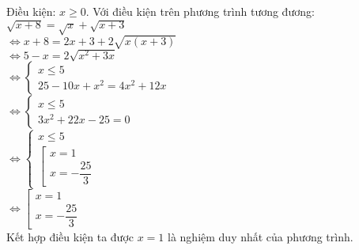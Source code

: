 \begin{Answer}{5}
Điều kiện: $ x \geq 0 $.
Với điều kiện trên phương trình tương đương: $ \sqrt{x+8 } = \sqrt{x } + \sqrt{x + 3}  $ \\
$ \Leftrightarrow x+8 = 2x +3 + 2 \sqrt{x(x+3 ) } $ \\
$ \Leftrightarrow 5-x = 2 \sqrt{x^2 + 3x } $ \\
$ \Leftrightarrow \begin{cases}
    x \leq 5 \\
    25 -10x + x^2 = 4x^2 + 12x
\end{cases} $ \\
$ \Leftrightarrow \begin{cases}
    x \leq 5 \\
    3x^2 +22x -25 =0
\end{cases} $ \\
$ \Leftrightarrow \begin{cases}
    x \leq 5 \\
    \left[
        \begin{array}{l}
            x =1 \\
            x= -\dfrac{25 }{3 }
        \end{array}
    \right.
\end{cases} $ \\
$ \Leftrightarrow \left[
    \begin{array}{l}
        x =1 \\
        x=-\dfrac{25 }{3 }
    \end{array}
\right. $ \\
Kết hợp điều kiện ta được $x=1$ là nghiệm duy nhất của phương trình.
\end{Answer}
\begin{Answer}{6}

\end{Answer}
\begin{Answer}{7}

\end{Answer}
\begin{Answer}{8}

\end{Answer}
\begin{Answer}{9}

\end{Answer}
\begin{Answer}{10}

\end{Answer}
